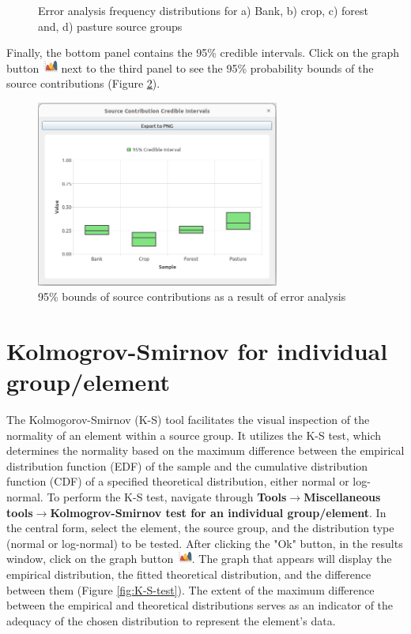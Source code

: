 \documentclass[12pt]{report}
\begin{document}
\begin{figure}[ht]
\begin{tabular}{c c}
    \end{tabular}
    \caption{Error analysis frequency distributions for a) Bank, b) crop, c) forest and, d) pasture source groups  }
    \label{fig:Error_analysis_results}
\end{figure}
\FloatBarrier

Finally, the bottom panel contains the 95\% credible intervals. Click on the graph button \includegraphics[width=0.5cm]{Figures/Graph.png} next to the third panel to see the 95\% probability bounds of the source contributions (Figure \ref{fig:Error_Analysis_95_bound}). 

\begin{figure}[ht]
    \centering
    \includegraphics[width=8cm]{Figures/Error_Analysis_CI.png} 
    \caption{95\% bounds of source contributions as a result of error analysis}
    \label{fig:Error_Analysis_95_bound}
\end{figure}
\FloatBarrier

\section{Kolmogrov-Smirnov for individual group/element}

The Kolmogorov-Smirnov (K-S) tool facilitates the visual inspection of the normality of an element within a source group. It utilizes the K-S test, which determines the normality based on the maximum difference between the empirical distribution function (EDF) of the sample and the cumulative distribution function (CDF) of a specified theoretical distribution, either normal or log-normal. To perform the K-S test, navigate through \textbf{Tools}$\rightarrow$\textbf{Miscellaneous tools}$\rightarrow$\textbf{Kolmogrov-Smirnov test for an individual group/element}. In the central form, select the element, the source group, and the distribution type (normal or log-normal) to be tested. After clicking the "Ok" button, in the results window, click on the graph button \includegraphics[width=0.5cm]{Figures/Graph.png}. The graph that appears will display the empirical distribution, the fitted theoretical distribution, and the difference between them (Figure \ref{fig:K-S-test}). The extent of the maximum difference between the empirical and theoretical distributions serves as an indicator of the adequacy of the chosen distribution to represent the element's data.
\end{document}
